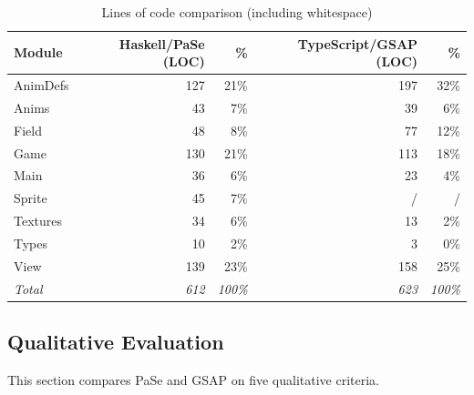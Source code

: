 \begin{table}[t!]
\caption{Lines of code comparison (including whitespace)}
\centering
\label{tbl:loc}
\begin{center}
\begin{tabular}{l@{\hskip 0.5cm}rr@{\hskip 0.2cm}rr}
 \textbf{Module} & \textbf{Haskell/PaSe (LOC)} & \textbf{\%} & \textbf{TypeScript/GSAP (LOC)} & \textbf{\%} \\
 \hline
 AnimDefs & 127 & 21\% & 197 & 32\% \\ 
 Anims & 43 & 7\% & 39 & 6\% \\  
 Field & 48 & 8\% & 77 & 12\% \\  
 Game & 130 & 21\% & 113 & 18\% \\  
 Main & 36 & 6\% & 23 & 4\% \\  
 Sprite & 45 & 7\% & / & / \\  
 Textures & 34 & 6\% & 13 & 2\% \\  
 Types & 10 & 2\% & 3 & 0\% \\  
 View & 139 & 23\% & 158 & 25\% \\
 \emph{Total} & \emph{612} & \emph{100\%} & \emph{623} & \emph{100\%}
\end{tabular}
\end{center}
\end{table}

\subsection{Qualitative Evaluation}

This section compares PaSe and GSAP on five qualitative criteria.

